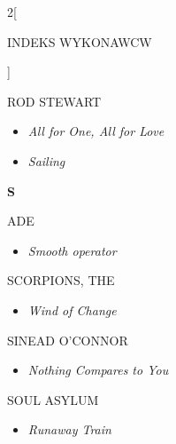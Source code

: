 \documentclass[a4paper]{report}
\begin{document}
\begin{multicols*}{2}[\begin{Huge}INDEKS WYKONAWCW\end{Huge}\vspace{1cm}]
\begin{minipage}{\columnwidth}
\begin{itemize}[topsep=3pt, after=\vspace{3mm}]
	\end{itemize}
\end{minipage}
\begin{minipage}{\columnwidth}
	ROD STEWART 
	\begin{itemize}[topsep=3pt, after=\vspace{3mm}]
		\itemsep0em
		\item[]\textit{All for One, All for Love}  \\
		\item[]  \textit{Sailing}  \\
	\end{itemize}
\end{minipage}
\begin{minipage}{\columnwidth}
	\begin{Large}\textbf{S}\end{Large}ADE 
	\begin{itemize}[topsep=3pt, after=\vspace{3mm}]
		\itemsep0em
		\item[]\textit{Smooth operator}  \\
	\end{itemize}
\end{minipage}
\begin{minipage}{\columnwidth}
	SCORPIONS, THE 
	\begin{itemize}[topsep=3pt, after=\vspace{3mm}]
		\itemsep0em
		\item[]\textit{Wind of Change}  \\
	\end{itemize}
\end{minipage}
\begin{minipage}{\columnwidth}
	SINEAD O'CONNOR 
	\begin{itemize}[topsep=3pt, after=\vspace{3mm}]
		\itemsep0em
		\item[]\textit{Nothing Compares to You}  \\
	\end{itemize}
\end{minipage}
\begin{minipage}{\columnwidth}
	SOUL ASYLUM 
	\begin{itemize}[topsep=3pt, after=\vspace{3mm}]
		\itemsep0em
		\item[]\textit{Runaway Train}  \\
	\end{itemize}

\end{minipage}
\end{multicols*}
\end{document}
